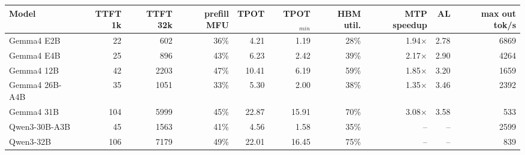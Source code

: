 \begin{tabular}{lrrrrrrrrr}
\toprule
Model & TTFT 1k & TTFT 32k & prefill MFU & TPOT & TPOT$_{min}$ & HBM util. & MTP speedup & AL & max out tok/s \\
\midrule
Gemma4 E2B & 22 & 602 & 36\% & 4.21 & 1.19 & 28\% & 1.94$\times$ & 2.78 & 6869 \\
Gemma4 E4B & 25 & 896 & 43\% & 6.23 & 2.42 & 39\% & 2.17$\times$ & 2.90 & 4264 \\
Gemma4 12B & 42 & 2203 & 47\% & 10.41 & 6.19 & 59\% & 1.85$\times$ & 3.20 & 1659 \\
Gemma4 26B-A4B & 35 & 1051 & 33\% & 5.30 & 2.00 & 38\% & 1.35$\times$ & 3.46 & 2392 \\
Gemma4 31B & 104 & 5999 & 45\% & 22.87 & 15.91 & 70\% & 3.08$\times$ & 3.58 & 533 \\
Qwen3-30B-A3B & 45 & 1563 & 41\% & 4.56 & 1.58 & 35\% & -- & -- & 2599 \\
Qwen3-32B & 106 & 7179 & 49\% & 22.01 & 16.45 & 75\% & -- & -- & 839 \\
\bottomrule
\end{tabular}
